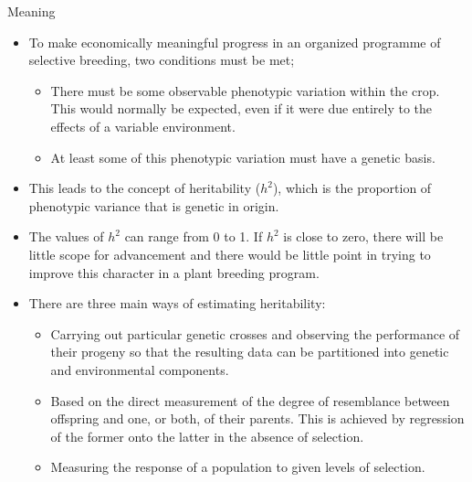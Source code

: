 \documentclass[11pt,ignorenonframetext,aspectratio=169]{beamer}
\providecommand{\tightlist}{%
  \setlength{\itemsep}{0pt}\setlength{\parskip}{0pt}}
\begin{document}
\begin{frame}{Meaning}
\protect\hypertarget{meaning}{}
\small

\begin{itemize}
\tightlist
\item
  To make economically meaningful progress in an organized programme of
  selective breeding, two conditions must be met;

  \begin{itemize}
  \footnotesize
  \item There must be some observable phenotypic variation within the crop. This would normally be expected, even if it were due entirely to the effects of a variable environment.
  \item At least some of this phenotypic variation must have a genetic basis.
  \end{itemize}
\item
  This leads to the concept of heritability (\(h^2\)), which is the
  proportion of phenotypic variance that is genetic in origin.
\item
  The values of \(h^2\) can range from 0 to 1. If \(h^2\) is close to
  zero, there will be little scope for advancement and there would be
  little point in trying to improve this character in a plant breeding
  program.
\item
  There are three main ways of estimating heritability:

  \begin{itemize}
  \footnotesize
  \item Carrying out particular genetic crosses and observing the performance of their progeny so that the resulting data can be partitioned into genetic and environmental components.
  \item Based on the direct measurement of the degree of resemblance between offspring and one, or both, of their parents. This is achieved by regression of the former onto the latter in the absence of selection.
  \item Measuring the response of a population to given levels of selection.
  \end{itemize}
\end{itemize}
\end{frame}
\end{document}

